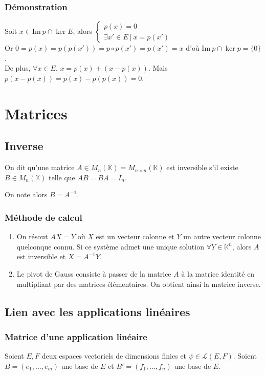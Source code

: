 \documentclass[a4paper,10pt]{book} %
\newcommand{\K}{\mathbb{K}}
\newcommand{\evs}{espaces vectoriels }
\newcommand{\tq}{~|~}
\newcommand{\Ima}{\mathrm{Im}~} %
\begin{document}
\subsubsection{Démonstration}
Soit $x\in \Ima p \cap \ker E$, alors $\left\{\begin{array}{c}p(x)=0 \\\exists x'\in E \tq x=p(x')\end{array}\right.$\\
Or $0=p(x)=p(p(x'))=p\circ p(x')=p(x')=x$ d'où $\Ima p\cap \ker p=\{0\}$.\\

De plus, $\forall x\in E$, $x=p(x)+(x-p(x))$. Mais $p(x-p(x))=p(x)-p(p(x))=0$.

\newpage

\section{Matrices}
\subsection{Inverse}
On dit qu'une matrice $A\in M_n(\K)=M_{n\times n}(\K)$ est inversible s'il existe $B\in M_n(\K)$ telle que $AB=BA=I_n$.

On note alors $B=A^{-1}$.

\subsubsection{Méthode de calcul}
\begin{enumerate}
\item On résout $AX=Y$ où $X$ est un vecteur colonne et $Y$ un autre vecteur colonne quelconque connu.
Si ce système admet une unique solution $\forall Y \in \K^n$, alors $A$ est inversible et $X=A^{-1}Y$.\\

\item Le pivot de Gauss consiste à passer de la matrice $A$ à la matrice identité en multipliant par des matrices élémentaires. On obtient ainsi la matrice inverse.
\end{enumerate}


\subsection{Lien avec les applications linéaires}
\subsubsection{Matrice d'une application linéaire}
Soient $E,F$ deux \evs de dimensions finies et $\psi \in \mathcal{L}(E,F)$. Soient $B=(e_1,...,e_m)$ une base de $E$ et $B'=(f_1,...,f_n)$ une base de $E$.\\
\end{document}
